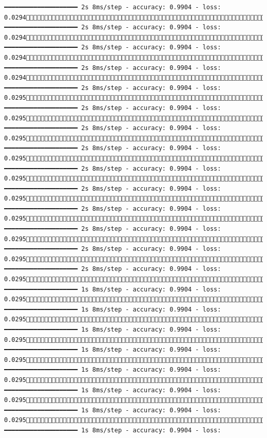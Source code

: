 \documentclass[
  letterpaper,
  DIV=11,
  numbers=noendperiod]{scrreprt}
\begin{document}
\begin{verbatim}
━━━━━━━━━━━━━━━━━━━━ 2s 8ms/step - accuracy: 0.9904 - loss: 0.02941532/1875 ━━━━━━━━━━━━━━━━━━━━ 2s 8ms/step - accuracy: 0.9904 - loss: 0.02941538/1875 ━━━━━━━━━━━━━━━━━━━━ 2s 8ms/step - accuracy: 0.9904 - loss: 0.02941544/1875 ━━━━━━━━━━━━━━━━━━━━ 2s 8ms/step - accuracy: 0.9904 - loss: 0.02941550/1875 ━━━━━━━━━━━━━━━━━━━━ 2s 8ms/step - accuracy: 0.9904 - loss: 0.02951556/1875 ━━━━━━━━━━━━━━━━━━━━ 2s 8ms/step - accuracy: 0.9904 - loss: 0.02951563/1875 ━━━━━━━━━━━━━━━━━━━━ 2s 8ms/step - accuracy: 0.9904 - loss: 0.02951569/1875 ━━━━━━━━━━━━━━━━━━━━ 2s 8ms/step - accuracy: 0.9904 - loss: 0.02951575/1875 ━━━━━━━━━━━━━━━━━━━━ 2s 8ms/step - accuracy: 0.9904 - loss: 0.02951582/1875 ━━━━━━━━━━━━━━━━━━━━ 2s 8ms/step - accuracy: 0.9904 - loss: 0.02951589/1875 ━━━━━━━━━━━━━━━━━━━━ 2s 8ms/step - accuracy: 0.9904 - loss: 0.02951596/1875 ━━━━━━━━━━━━━━━━━━━━ 2s 8ms/step - accuracy: 0.9904 - loss: 0.02951603/1875 ━━━━━━━━━━━━━━━━━━━━ 2s 8ms/step - accuracy: 0.9904 - loss: 0.02951611/1875 ━━━━━━━━━━━━━━━━━━━━ 2s 8ms/step - accuracy: 0.9904 - loss: 0.02951618/1875 ━━━━━━━━━━━━━━━━━━━━ 1s 8ms/step - accuracy: 0.9904 - loss: 0.02951625/1875 ━━━━━━━━━━━━━━━━━━━━ 1s 8ms/step - accuracy: 0.9904 - loss: 0.02951632/1875 ━━━━━━━━━━━━━━━━━━━━ 1s 8ms/step - accuracy: 0.9904 - loss: 0.02951640/1875 ━━━━━━━━━━━━━━━━━━━━ 1s 8ms/step - accuracy: 0.9904 - loss: 0.02951647/1875 ━━━━━━━━━━━━━━━━━━━━ 1s 8ms/step - accuracy: 0.9904 - loss: 0.02951654/1875 ━━━━━━━━━━━━━━━━━━━━ 1s 8ms/step - accuracy: 0.9904 - loss: 0.02951661/1875 ━━━━━━━━━━━━━━━━━━━━ 1s 8ms/step - accuracy: 0.9904 - loss: 0.02951668/1875 ━━━━━━━━━━━━━━━━━━━━ 1s 8ms/step - accuracy: 0.9904 - loss: 
\end{verbatim}
\end{document}
